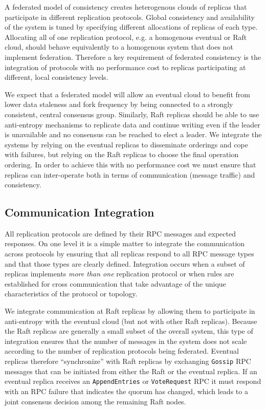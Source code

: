 \documentclass[10pt,conference,letterpaper]{IEEEtran}
\begin{document}
A federated model of consistency creates heterogenous clouds of replicas that participate
in different replication protocols.
Global consistency and availability of the system is tuned by specifying different
allocations of replicas of each type.
Allocating all of one replication protocol, e.g. a homogenous eventual or Raft cloud,
should behave equivalently to a homogenous system that does not implement federation.
Therefore a key requirement of federated consistency is the integration of protocols with
no performance cost to replicas participating at different, local consistency levels.

We expect that a federated model will allow an eventual cloud to benefit from lower data
staleness and fork frequency by being connected to a strongly consistent, central
consensus group.
Similarly, Raft replicas should be able to use anti-entropy mechanisms to replicate data
and continue writing even if the leader is unavailable and no consensus can be reached to
elect a leader.
We integrate the systems by relying on the eventual replicas to disseminate orderings and
cope with failures, but relying on the Raft replicas to choose the final operation
ordering.
In order to achieve this with no performance cost we must ensure that replicas can
inter-operate both in terms of communication (message traffic) and consistency.

\subsection{Communication Integration}

All replication protocols are defined by their RPC messages and expected responses.
On one level it is a simple matter to integrate the communication across protocols by
ensuring that all replicas respond to all RPC message types and that those types are
clearly defined.
Integration occurs when a subset of replicas implements \textit{more than one}
replication protocol or when rules are established for cross communication that take
advantage of the unique characteristics of the protocol or topology.

We integrate communication at Raft replicas by allowing them to participate in
anti-entropy with the eventual cloud (but not with other Raft replicas).
Because the Raft replicas are generally a small subset of the overall system, this type
of integration ensures that the number of messages in the system does not scale according
to the number of replication protocols being federated.
Eventual replicas therefore ``synchronize'' with Raft replicas by exchanging
\texttt{Gossip} RPC messages that can be initiated from either the Raft or the eventual
replica.
If an eventual replica receives an \texttt{AppendEntries} or \texttt{VoteRequest} RPC it
must respond with an RPC failure that indicates the quorum has changed, which leads to a
joint consensus decision among the remaining Raft nodes.
\end{document}
